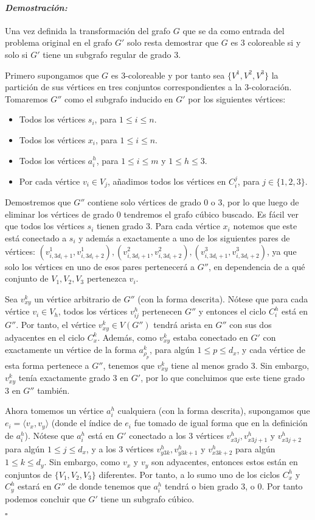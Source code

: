 \documentclass[10pt]{amsart}
\theoremstyle{definition}
\numberwithin{equation}{section}
\newenvironment{myproof} {\paragraph{\emph{Demostraci\'on:}}}{\hfill$\square$}
\newcommand{\edge}[1]{\langle #1\rangle}
\begin{document}
\begin{myproof}
	Una vez definida la transformaci\'on del grafo $G$ que se da como entrada del problema original en el grafo $G'$ solo resta demostrar que $G$ es $3$ coloreable si y solo si $G'$ tiene un subgrafo regular de grado $3$.
	
	Primero supongamos que $G$ es $3$-coloreable y por tanto sea $\{V^1, V^2, V^3 \}$ la partici\'on de sus v\'ertices en tres conjuntos correspondientes a la $3$-coloraci\'on. Tomaremos $G''$ como el subgrafo inducido en $G'$ por los siguientes v\'ertices:
	\begin{itemize}
		\item Todos los v\'ertices $s_i$, para $1 \le i \le n$.
		\item Todos los v\'ertices $x_i$, para $1 \le i \le n$.
		\item Todos los v\'ertices $a_i^h$, para $1 \le i \le m $ y $1 \le h \le 3$.
		\item Por cada v\'ertice $v_i \in V_j$, a\~nadimos todos los v\'ertices en $C_i^j$, para $j \in \{1,2,3\}$.
	\end{itemize}

	Demostremos que $G''$ contiene solo v\'ertices de grado $0$ o $3$, por lo que luego de eliminar los v\'ertices de grado $0$ tendremos el grafo c\'ubico buscado. Es f\'acil ver que todos los v\'ertices $s_i$ tienen grado $3$. Para cada v\'ertice $x_i$ notemos que este est\'a conectado a $s_i$ y adem\'as a exactamente a uno de los siguientes pares de v\'ertices: $(v_{i,3d_i + 1}^1, v_{i,3d_i + 2}^1), (v_{i,3d_i + 1}^2, v_{i,3d_i + 2}^2), (v_{i,3d_i + 1}^3, v_{i,3d_i + 2}^3)$, ya que solo los v\'ertices en uno de esos pares pertenecer\'a a $G''$, en dependencia de a qu\'e conjunto de $V_1, V_2, V_3$ pertenezca $v_i$. 
	
	Sea $v_{xy}^k$ un v\'ertice arbitrario de $G''$ (con la forma descrita). N\'otese que para cada v\'ertice $v_i \in V_h$, todos los v\'ertices $v_{ij}^h$ pertenecen $G''$ y entonces el ciclo $C_{i}^h$ est\'a en $G''$. Por tanto, el v\'ertice $v_{xy}^k \in V(G'')$ tendr\'a arista en $G''$ con sus dos adyacentes en el ciclo $C_x^k$. Adem\'as, como $v_{xy}^k$ estaba conectado en $G'$ con exactamente un v\'ertice de la forma $a_{\rho_p}^k$, para alg\'un $1 \le p \le d_x$, y cada v\'ertice de esta forma pertenece a $G''$, tenemos que $v_{xy}^k$ tiene al menos grado $3$. Sin embargo, $v_{xy}^k$ ten\'ia exactamente grado $3$ en $G'$, por lo que concluimos que este tiene grado $3$ en $G''$ tambi\'en.
	
	Ahora tomemos un v\'ertice $a_i^h$ cualquiera (con la forma descrita), supongamos que $e_i = \edge{v_x, v_y}$ (donde el \'indice de $e_i$ fue tomado de igual forma que en la definici\'on de $a_i^h$). N\'otese que $a_i^h$ est\'a en $G'$ conectado a los $3$ v\'ertices $v_{x3j}^h, v_{x3j + 1}^h$ y $v_{x3j + 2}^h$ para alg\'un $1 \le j \le d_x$, y a los $3$ v\'ertices $v_{y3k}^h, v_{y3k + 1}^h$ y $v_{x3k + 2}^h$ para alg\'un $1 \le k \le d_y$. Sin embargo, como $v_x$ y $v_y$ son adyacentes, entonces estos est\'an en conjuntos de  $\{V_1,V_2, V_3\}$ diferentes. Por tanto, a lo sumo uno de los ciclos $C_x^h$ y $C_y^h$ estar\'a en $G''$ de donde tenemos que $a_i^h$ tendr\'a o bien grado $3$, o $0$. Por tanto podemos concluir que $G'$ tiene un subgrafo c\'ubico.
	

\end{myproof}
\end{document}
